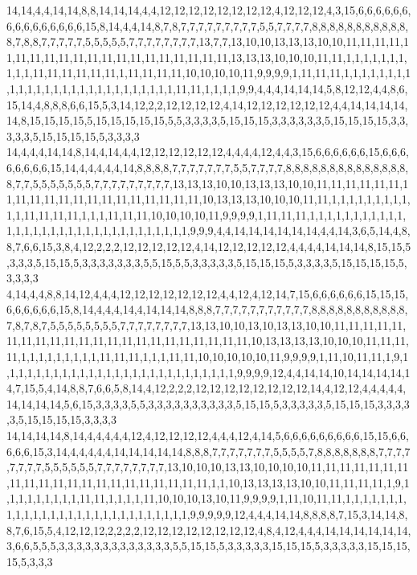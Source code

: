 14,14,4,4,14,14,8,8,14,14,14,4,4,12,12,12,12,12,12,12,12,4,12,12,12,4,3,15,6,6,6,6,6,6,6,6,6,6,6,6,6,6,6,15,8,14,4,4,14,8,7,8,7,7,7,7,7,7,7,7,7,5,5,7,7,7,7,8,8,8,8,8,8,8,8,8,8,8,8,7,8,8,7,7,7,7,7,5,5,5,5,5,7,7,7,7,7,7,7,7,13,7,7,13,10,10,13,13,13,10,10,11,11,11,11,11,11,11,11,11,11,11,11,11,11,11,11,11,11,11,11,13,13,13,10,10,10,11,11,1,1,1,1,1,1,1,1,1,1,11,11,11,11,11,11,1,11,11,11,11,10,10,10,10,11,9,9,9,9,1,11,11,11,1,1,1,1,1,1,1,1,1,1,1,1,1,1,1,1,1,1,1,1,1,1,1,1,1,1,1,11,11,1,1,1,1,9,9,4,4,4,14,14,14,5,8,12,12,4,4,8,6,15,14,4,8,8,8,6,6,15,5,3,14,12,2,2,12,12,12,12,4,14,12,12,12,12,12,12,4,4,14,14,14,14,14,8,15,15,15,15,5,15,15,15,15,15,5,5,3,3,3,3,5,15,15,15,3,3,3,3,3,3,5,15,15,15,15,3,3,3,3,3,5,15,15,15,15,5,3,3,3,3
14,4,4,4,14,14,8,14,4,14,4,4,12,12,12,12,12,12,4,4,4,4,12,4,4,3,15,6,6,6,6,6,6,15,6,6,6,6,6,6,6,6,15,14,4,4,4,4,4,14,8,8,8,8,7,7,7,7,7,7,7,5,5,7,7,7,7,8,8,8,8,8,8,8,8,8,8,8,8,8,8,8,7,7,5,5,5,5,5,5,5,7,7,7,7,7,7,7,7,7,13,13,13,10,10,13,13,13,10,10,11,11,11,11,11,11,11,11,11,11,11,11,11,11,11,11,11,11,11,11,10,13,13,13,10,10,10,11,11,1,1,1,1,1,1,1,1,1,1,1,11,11,11,11,1,1,1,11,11,11,10,10,10,10,11,9,9,9,9,1,11,11,11,1,1,1,1,1,1,1,1,1,1,1,1,1,1,1,1,1,1,1,1,1,1,1,1,1,1,1,1,1,1,1,1,9,9,9,4,4,14,14,14,14,14,14,4,4,14,3,6,5,14,4,8,8,7,6,6,15,3,8,4,12,2,2,2,12,12,12,12,12,4,14,12,12,12,12,12,4,4,4,4,14,14,14,8,15,15,5,3,3,3,5,15,15,5,3,3,3,3,3,3,3,5,5,15,5,5,3,3,3,3,3,5,15,15,15,5,3,3,3,3,5,15,15,15,15,5,3,3,3,3
4,14,4,4,8,8,14,12,4,4,4,12,12,12,12,12,12,12,4,4,12,4,12,14,7,15,6,6,6,6,6,6,15,15,15,6,6,6,6,6,6,15,8,14,4,4,4,14,4,14,14,14,8,8,8,7,7,7,7,7,7,7,7,7,7,7,8,8,8,8,8,8,8,8,8,8,8,7,8,7,8,7,5,5,5,5,5,5,5,5,7,7,7,7,7,7,7,7,13,13,10,10,13,10,13,13,10,10,11,11,11,11,11,11,11,11,11,11,11,11,11,11,11,11,11,11,11,11,11,11,10,13,13,13,13,10,10,10,11,11,11,11,1,1,1,1,1,1,1,1,1,11,11,11,1,1,1,11,11,10,10,10,10,10,11,9,9,9,9,1,11,10,11,11,1,9,1,1,1,1,1,1,1,1,1,1,1,1,1,1,1,1,1,1,1,1,1,1,1,1,1,1,1,9,9,9,9,12,4,4,14,14,10,14,14,14,14,14,7,15,5,4,14,8,8,7,6,6,5,8,14,4,12,2,2,2,12,12,12,12,12,12,12,12,14,4,12,12,4,4,4,4,4,14,14,14,14,5,6,15,3,3,3,3,5,5,3,3,3,3,3,3,3,3,3,3,5,15,15,5,3,3,3,3,3,5,15,15,15,3,3,3,3,3,5,15,15,15,15,3,3,3,3
14,14,14,14,8,14,4,4,4,4,4,12,4,12,12,12,12,4,4,4,12,4,14,5,6,6,6,6,6,6,6,6,6,15,15,6,6,6,6,6,15,3,14,4,4,4,4,4,14,14,14,14,14,8,8,8,7,7,7,7,7,7,7,5,5,5,5,7,8,8,8,8,8,8,8,7,7,7,7,7,7,7,7,5,5,5,5,5,5,7,7,7,7,7,7,7,7,13,10,10,10,13,13,10,10,10,10,11,11,11,11,11,11,11,11,11,11,11,11,11,11,11,11,11,11,11,11,11,1,1,10,13,13,13,13,10,10,11,11,11,11,1,9,1,1,1,1,1,1,1,1,1,11,11,1,1,1,1,11,10,10,10,13,10,11,9,9,9,9,1,11,10,11,11,1,1,1,1,1,1,1,1,1,1,1,1,1,1,1,1,1,1,1,1,1,1,1,1,1,1,1,1,9,9,9,9,9,12,4,4,4,14,14,8,8,8,8,7,15,3,14,14,8,8,7,6,15,5,4,12,12,12,2,2,2,2,12,12,12,12,12,12,12,12,4,8,4,12,4,4,4,14,14,14,14,14,14,3,6,6,5,5,5,3,3,3,3,3,3,3,3,3,3,3,3,3,5,5,15,15,5,3,3,3,3,3,15,15,15,5,3,3,3,3,3,15,15,15,15,5,3,3,3
